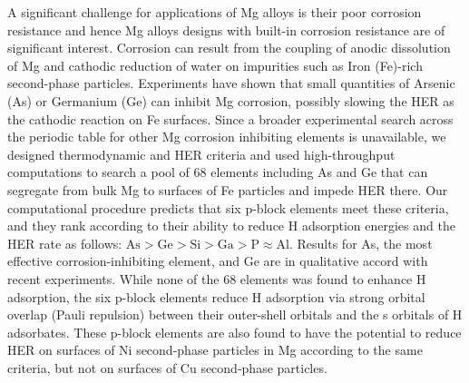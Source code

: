 A significant challenge for applications of Mg alloys is their poor corrosion resistance and hence Mg alloys designs with built-in corrosion resistance are of significant interest. Corrosion can result from the coupling of anodic dissolution of Mg and cathodic reduction of water on impurities such as Iron (Fe)-rich second-phase particles. Experiments have shown that small quantities of Arsenic (As) or Germanium (Ge) can inhibit Mg corrosion, possibly slowing the \ac{HER} as the cathodic reaction on Fe surfaces. Since a broader experimental search across the periodic table for other Mg corrosion inhibiting elements is unavailable, we designed thermodynamic and \ac{HER} criteria and used high-throughput computations to search a pool of 68 elements including As and Ge that can segregate from bulk Mg to surfaces of Fe particles and impede \ac{HER} there. Our computational procedure predicts that six p-block elements meet these criteria, and they rank according to their ability to reduce H adsorption energies and the \ac{HER} rate as follows: $\text{As} > \text{Ge} > \text{Si} > \text{Ga} > \text{P} \approx \text{Al}$. Results for As, the most effective corrosion-inhibiting element, and Ge are in qualitative accord with recent experiments. While none of the 68 elements was found to enhance H adsorption, the six p-block elements reduce H adsorption via strong orbital overlap (Pauli repulsion) between their outer-shell orbitals and the s orbitals of H adsorbates. These p-block elements are also found to have the potential to reduce \ac{HER} on surfaces of Ni second-phase particles in Mg according to the same criteria, but not on surfaces of Cu second-phase particles. 








